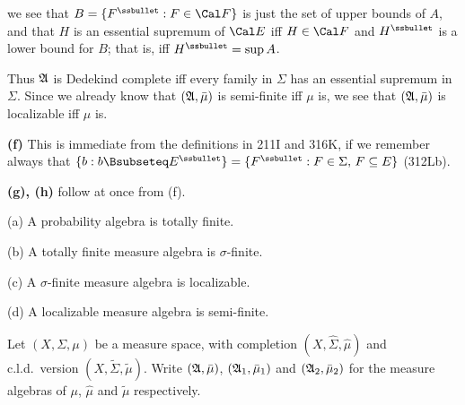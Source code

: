 {

\noindent we see that $B=\{F^{\ssbullet}:F\in\Cal F\}$ is just the set
of upper bounds of $A$, and that $H$ is an essential supremum of $\Cal
E$ iff $H\in\Cal F$ and $H^{\ssbullet}$ is a lower bound for $B$;  that
is, iff $H^{\ssbullet}=\sup A$.\ \Qed

\medskip

 Thus $\frak A$ is Dedekind complete iff every family in
$\Sigma$ has an essential supremum in $\Sigma$.   Since we already know
that $(\frak A,\bar\mu)$ is semi-finite iff $\mu$ is, we see that
$(\frak A,\bar\mu)$ is localizable iff $\mu$ is.

\medskip

{\bf (f)} This is immediate from the definitions in 211I and 316K, if
we remember always that $\{b:b\Bsubseteq E^{\ssbullet}\}
=\{F^{\ssbullet}:F\in\Sigma,\,F\subseteq E\}$ (312Lb).

\medskip

{\bf (g), (h)} follow at once from (f).
}%

 (a) A probability algebra is totally finite.

(b) A totally finite measure algebra is $\sigma$-finite.

(c) A $\sigma$-finite measure algebra is localizable.

(d) A localizable measure algebra is semi-finite.


 Let $(X,\Sigma,\mu)$ be a measure space,
with completion $(X,\hat\Sigma,\hat\mu)$ and c.l.d.\ version
$(X,\tilde\Sigma,\tilde\mu)$.   Write
$(\frak A,\bar\mu)$, $(\frak A_1,\bar\mu_1)$ and $(\frak A_2,\bar\mu_2)$
for the measure algebras of $\mu$, $\hat\mu$ and $\tilde\mu$
respectively.

